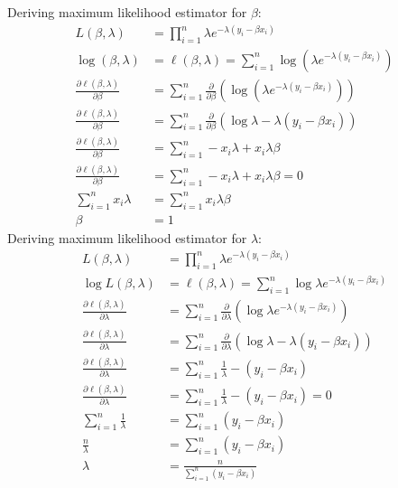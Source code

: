 \documentclass[12pt]{article}
\begin{document}
\begin{enumerate}[1.]
\begin{enumerate}
                Deriving maximum likelihood estimator for $\beta$:
                \begin{align*}
                    L(\beta, \lambda) &= \prod_{i=1}^{n} \lambda e^{-\lambda (y_i - \beta x_i)} \\
                    \log (\beta, \lambda) &= \ell (\beta, \lambda) = \sum_{i=1}^{n} \log (\lambda e^{-\lambda (y_i - \beta x_i)}) \\
                    \frac{\partial \ell (\beta, \lambda)}{\partial \beta} &= \sum_{i=1}^{n} \frac{\partial}{\partial \beta} \left( \log (\lambda e^{-\lambda (y_i - \beta x_i)}) \right) \\
                    \frac{\partial \ell (\beta, \lambda)}{\partial \beta} &= \sum_{i=1}^{n} \frac{\partial}{\partial \beta} \left( \log \lambda - \lambda (y_i - \beta x_i)  \right) \\
                    \frac{\partial \ell (\beta, \lambda)}{\partial \beta} &= \sum_{i=1}^{n} -x_i \lambda + x_i \lambda \beta \\
                    \frac{\partial \ell (\beta, \lambda)}{\partial \beta} &= \sum_{i=1}^{n} -x_i \lambda + x_i \lambda \beta = 0 \\
                    \sum_{i=1}^{n} x_i \lambda &= \sum_{i=1}^{n} x_i \lambda \beta \\
                    \beta &= 1
                \end{align*}
                Deriving maximum likelihood estimator for $\lambda$:
                \begin{align*}
                    L(\beta, \lambda) &= \prod_{i=1}^{n} \lambda e^{-\lambda (y_i - \beta x_i)} \\
                    \log L(\beta, \lambda) &= \ell (\beta, \lambda) = \sum_{i=1}^{n} \log \lambda e^{-\lambda (y_i - \beta x_i)} \\
                    \frac{\partial \ell (\beta, \lambda)}{\partial \lambda} &= \sum_{i=1}^{n} \frac{\partial}{\partial \lambda} \left(  \log \lambda e^{-\lambda (y_i - \beta x_i)} \right) \\
                    \frac{\partial \ell (\beta, \lambda)}{\partial \lambda} &= \sum_{i=1}^{n} \frac{\partial}{\partial \lambda} \left( \log \lambda - \lambda (y_i - \beta x_i) \right) \\
                    \frac{\partial \ell (\beta, \lambda)}{\partial \lambda} &= \sum_{i=1}^{n} \frac{1}{\lambda} - (y_i - \beta x_i) \\
                    \frac{\partial \ell (\beta, \lambda)}{\partial \lambda} &= \sum_{i=1}^{n} \frac{1}{\lambda} - (y_i - \beta x_i) = 0 \\
                    \sum_{i=1}^{n} \frac{1}{\lambda} &= \sum_{i=1}^{n} (y_i - \beta x_i) \\
                    \frac{n}{\lambda} &= \sum_{i=1}^{n} (y_i - \beta x_i) \\
                    \lambda &= \frac{n}{\sum_{i=1}^{n} (y_i - \beta x_i)}
                \end{align*}


\end{enumerate}
\end{enumerate}
\end{document}
